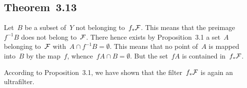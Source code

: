 \subsection{Theorem~3.13}

Let~$B$ be a subset of~$Y$ not belonging to~$f_* \mathcal{F}$.
This means that the preimage~$f^{-1} B$ does not belong to~$\mathcal{F}$.
There hence exists by Proposition~3.1 a set~$A$ belonging to~$\mathcal{F}$ with~$A ∩ f^{-1} B = ∅$.
This means that no point of~$A$ is mapped into~$B$ by the map~$f$, whence~$f A ∩ B = ∅$.
But the set~$f A$ is contained in~$f_* \mathcal{F}$.

According to Proposition~3.1, we have shown that the filter~$f_* \mathcal{F}$ is again an ultrafilter.
